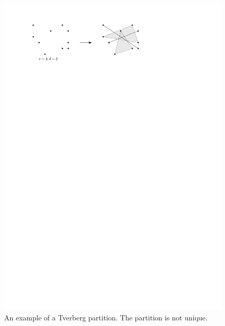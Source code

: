\documentclass[11pt]{article}
\newcommand{\rr}{\mathbb{R}}
\DeclareMathOperator{\conv}{conv}
\DeclareMathOperator{\aff}{aff}
\begin{document}
	\begin{figure}
		\centerline{\includegraphics[scale=1]{fig1-Tverberg}}
		\caption{An example of a Tverberg partition.  The partition is not unique.}
	\end{figure}
	
	
	
	
\end{document}
